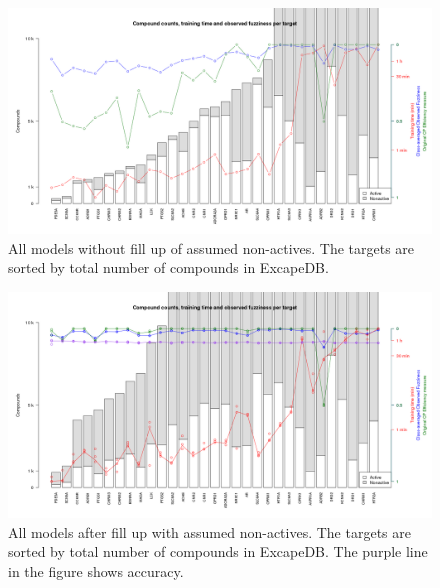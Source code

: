 \documentclass[utf8]{frontiersSCNS} %
\renewcommand{\todo}[1]{{\color{magenta}\oldtodo[fancyline]{\color{white}\textsf{#1}}}}
\newcommand{\inlinetodo}[1]{{\color{magenta}\oldtodo[inline]{\color{white}\textsf{#1}}}}
\begin{document}

\begin{figure}[h!]
\includegraphics[width=\textwidth]{figures/final_models_20171106_nofillup.png}
    \caption{All models without fill up of assumed non-actives. The targets
    are sorted by total number of compounds in ExcapeDB.}
    \label{fig:allmodels_nofillup}
\end{figure}


\begin{figure}[h!]
\includegraphics[width=\textwidth]{figures/final_models_20180223_fillup.png}
    \caption{All models after fill up with assumed non-actives. The targets are
    sorted by total number of compounds in ExcapeDB. The purple line in the
    figure shows accuracy.}
    \label{fig:allmodels_fillup}
\end{figure}
\end{document}
